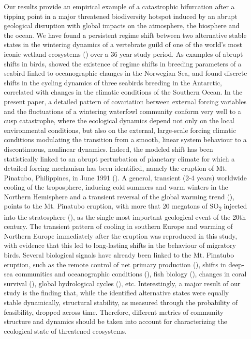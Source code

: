 \documentclass[12pt]{article}
\begin{document}
Our results provide an empirical example of a catastrophic bifurcation after a tipping point in a major threatened biodiversity hotspot induced by an abrupt geological disruption with global impacts on the atmosphere, the biosphere and the ocean. We have found a persistent regime shift between two alternative stable states in the wintering dynamics of a vertebrate guild of one of the world's most iconic wetland ecosystems (\cite{Scheffer2015a}) over a 36 year study period. As examples of abrupt shifts in birds, \cite{Durant2004} showed the existence of regime shifts in breeding parameters of a seabird linked to oceanographic changes in the Norwegian Sea, and \cite{Jenouvrier2005} found discrete shifts in the cycling dynamics of three seabirds breeding in the Antarctic, correlated with changes in the climatic conditions of the Southern Ocean. In the present paper, a detailed pattern of covariation between external forcing variables and the fluctuations of a wintering waterfowl community conform very well to a cusp catastrophe, where the ecological dynamics depend not only on the local environmental conditions, but also on the external, large-scale forcing climatic conditions modulating the transition from a smooth, linear system behaviour to a discontinuous, nonlinear dynamics. Indeed, the modeled shift has been statistically linked to an abrupt perturbation of planetary climate for which a detailed forcing mechanism has been identified, namely the eruption of Mt. Pinatubo, Philippines, in June 1991 (\cite{Hansen1992,Labitzke1992,Robock2000,Robock2002,Douglass2005}). A general, transient (2-4 years) worldwide cooling of the troposphere, inducing cold summers and warm winters in the Northern Hemisphere and a transient reversal of the global warming trend (\cite{Robock2000,Robock2002,Lucht2002a,Church2005,Smith2016a}), points to the Mt. Pinatubo eruption, with more that 20 megatons of SO\textsubscript{2} injected into the stratosphere (\cite{Hansen1992}), as the single most important geological event of the 20th century. The transient pattern of cooling in southern Europe and warming of Northern Europe immediately after the eruption was reproduced in this study, with evidence that this led to long-lasting shifts in the behaviour of migratory birds. Several biological signals have already been linked to the Mt. Pinatubo eruption, such as the remote control of net primary production (\cite{Lucht2002a,Krakauer2003}), shifts in deep-sea communities and oceanographic conditions (\cite{Hess2001,Kuhnt2005,Yao2018}), fish biology (\cite{Gaston2003a}), changes in coral survival (\cite{Genin1995}), global hydrological cycles (\cite{Trenberth2007}), etc. Interestingly, a major result of our study is the finding that, while the identified alternative states were equally stable dynamically, structural stability, as measured through the probability of feasibility, dropped across time. Therefore, different metrics of community structure and dynamics should be taken into account for characterizing the ecological state of threatened ecosystems.  \\
\end{document}
